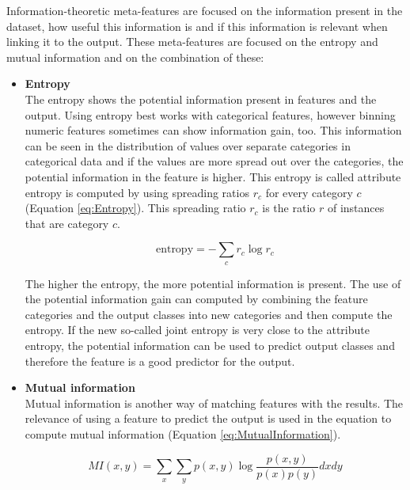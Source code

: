 \documentclass[10pt,a4paper]{article}
\begin{document}
	Information-theoretic meta-features are focused on the information present in the dataset, how useful this information is and if this information is relevant when linking it to the output. These meta-features are focused on the entropy and mutual information and on the combination of these:
	
	\begin{itemize}
		\item \textbf{Entropy} \\
		The entropy shows the potential information present in features and the output. Using entropy best works with categorical features, however binning numeric features sometimes can show information gain, too. This information can be seen in the distribution of values over separate categories in categorical data and if the values are more spread out over the categories, the potential information in the feature is higher. This entropy is called attribute entropy is computed by using spreading ratios $r_c$ for every category $c$ (Equation \ref{eq:Entropy}). This spreading ratio $r_c$ is the ratio $r$ of instances that are category $c$.
		
		\begin{equation}\label{eq:Entropy}
		\text{entropy} = - \sum_{c} r_c \log{r_c}
		\end{equation}
		
		The higher the entropy, the more potential information is present. The use of the potential information gain can computed by combining the feature categories and the output classes into new categories and then compute the entropy. If the new so-called joint entropy is very close to the attribute entropy, the potential information can be used to predict output classes and therefore the feature is a good predictor for the output\cite{agresti2003categorical}.
		
		\item \textbf{Mutual information} \\
		Mutual information is another way of matching features with the results. The relevance of using a feature to predict the output is used in the equation to compute mutual information (Equation \ref{eq:MutualInformation})\cite{chow1968approximating}. 
		
		\begin{equation}\label{eq:MutualInformation}
		MI(x, y) = \sum_x \sum_y p(x, y) \log{\frac{p(x, y)}{p(x)p(y)}} dxdy
		\end{equation}
		

\end{itemize}
\end{document}
